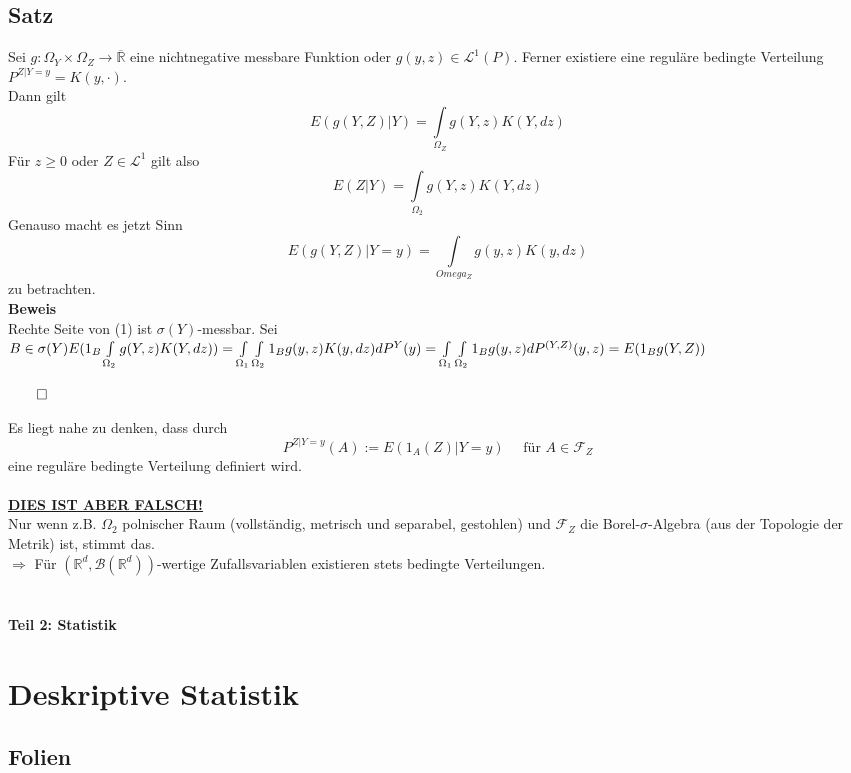 \documentclass[german,10pt,oneside, fleqn, a4paper]{article}
\newcommand {\R}	{\mathbb{R}}
\newcommand{\Ra}	{\Rightarrow}
\newcommand{\ra}{\rightarrow}
\newcommand{\brc}[1]{\left(#1\right)}
\newcommand{\QED}{\begin{flushright}$\qed$\end{flushright}}
\newcommand{\mc}[1]{\mathcal{#1}}
\newcommand{\lp}[1]{\mc{L}^{#1}}
\newcommand{\beweis}{\textbf{Beweis}\\}
\newcommand{\1}[1]{1_{#1}}
\newcommand{\2}[1]{\1{\brac{#1}}}
\newcommand{\rbor}[1][d]{\brc{\R^{#1},\mc{B}\brc{\R^{#1}}}}
\newcommand{\f}{\mc{F}}
\begin{document}
\subsection{Satz}
\label{7.6}
Sei $g:\Omega_Y\times\Omega_Z\ra\overline{\R}$ eine nichtnegative messbare Funktion oder $g(y,z)\in\lp{1}(P).$ Ferner existiere eine reguläre bedingte Verteilung $P^{Z|Y=y}=K(y,\cdot).$\\
Dann gilt\begin{equation}
E(g(Y,Z)|Y)=\int\limits_{\Omega_Z}g(Y,z)K(Y,dz)
\end{equation}
Für $z\geq0$ oder $Z\in\lp{1}$ gilt also \[
E(Z|Y)=\int\limits_{\Omega_2}g(Y,z)K(Y,dz)\]
Genauso macht es jetzt Sinn \[
E(g(Y,Z)|Y=y)=\int\limits_{Omega_Z}g(y,z)K(y,dz)\]
zu betrachten.\\
\beweis
Rechte Seite von (1) ist $\sigma(Y)$-messbar. Sei $B\in\sigma(Y)\\
E(1_B\int\limits_{\Omega_2}g(Y,z)K(Y,dz))=\int\limits_{\Omega_1}\int\limits_{\Omega_2}1_Bg(y,z)K(y,dz)dP^Y(y)\\
=\int\limits_{\Omega_1}\int\limits_{\Omega_2}1_Bg(y,z)dP^{(Y,Z)}(y,z)=E(1_Bg(Y,Z))$\QED

Es liegt nahe zu denken, dass durch \[
P^{Z|Y=y}(A):=E(1_A(Z)|Y=y)\quad\text{ für } A\in\f_Z\]
eine reguläre bedingte Verteilung definiert wird.\\
\\

\underline{\underline{\underline{\underline{\underline{\textbf{\huge{DIES IST ABER FALSCH!}}}}}}}\\
Nur wenn z.B. $\Omega_2$ polnischer Raum (vollständig, metrisch und separabel, gestohlen) und $\f_Z$ die Borel-$\sigma$-Algebra (aus der Topologie der Metrik) ist, stimmt das.\\
$\Ra$ Für $\rbor$-wertige Zufallsvariablen existieren stets bedingte Verteilungen.
\\
\\
\\






\textbf{\huge{Teil 2: Statistik}}
\section{Deskriptive Statistik}
\subsection{Folien}
%
\end{document}
